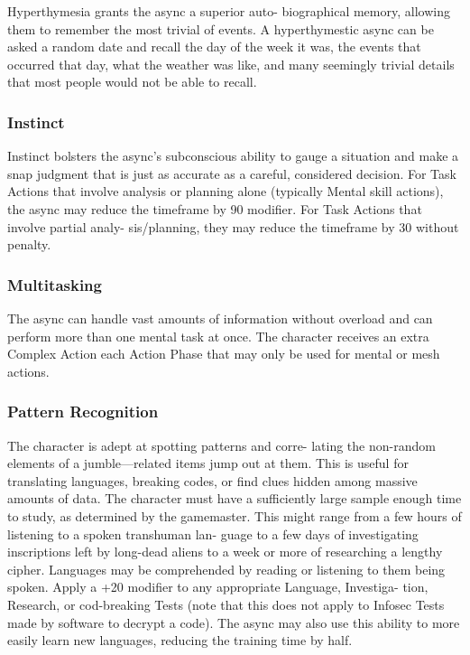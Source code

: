 Hyperthymesia grants the async a superior auto-
biographical memory, allowing them to remember the 
most trivial of events. A hyperthymestic async can be 
asked a random date and recall the day of the week 
it was, the events that occurred that day, what the 
weather was like, and many seemingly trivial details 
that most people would not be able to recall.

\subsubsection{Instinct}

Instinct bolsters the async's subconscious ability to 
gauge a situation and make a snap judgment that 
is just as accurate as a careful, considered decision. 
For Task Actions that involve analysis or planning 
alone (typically Mental skill actions), the async may 
reduce the timeframe by 90%
modifier. For Task Actions that involve partial analy-
sis/planning, they may reduce the timeframe by 30%
without penalty.

\subsubsection{Multitasking}

The async can handle vast amounts of information 
without overload and can perform more than one 
mental task at once. The character receives an extra 
Complex Action each Action Phase that may only be 
used for mental or mesh actions.

\subsubsection{Pattern Recognition}

The character is adept at spotting patterns and corre-
lating the non-random elements of a jumble—related 
items jump out at them. This is useful for translating 
languages, breaking codes, or find clues hidden among 
massive amounts of data. The character must have 
a sufficiently large sample enough time to study, as 
determined by the gamemaster. This might range from 
a few hours of listening to a spoken transhuman lan-
guage to a few days of investigating inscriptions left 
by long-dead aliens to a week or more of researching 
a lengthy cipher. Languages may be comprehended by 
reading or listening to them being spoken. Apply a 
+20 modifier to any appropriate Language, Investiga-
tion, Research, or cod-breaking Tests (note that this 
does not apply to Infosec Tests made by software to 
decrypt a code). The async may also use this ability to 
more easily learn new languages, reducing the training 
time by half.

